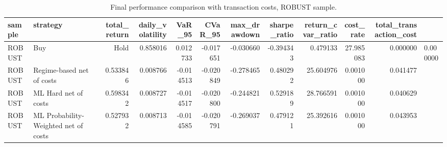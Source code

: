 \begin{table}
\caption{Final performance comparison with transaction costs, ROBUST sample.}
\label{tab:final_performance_metrics_with_costs_robust}
\begin{tabular}{llrrrrrrrrr}
\toprule
sample & strategy & total_return & daily_volatility & VaR_95 & CVaR_95 & max_drawdown & sharpe_ratio & return_cvar_ratio & cost_rate & total_transaction_cost \\
\midrule
ROBUST & Buy & Hold & 0.858016 & 0.012733 & -0.017651 & -0.030660 & -0.394343 & 0.479133 & 27.985083 & 0.000000 & 0.000000 \\
ROBUST & Regime-based net of costs & 0.533846 & 0.008766 & -0.014513 & -0.020849 & -0.278465 & 0.480292 & 25.604976 & 0.001000 & 0.041477 \\
ROBUST & ML Hard net of costs & 0.598342 & 0.008727 & -0.014517 & -0.020800 & -0.244821 & 0.529189 & 28.766591 & 0.001000 & 0.040629 \\
ROBUST & ML Probability-Weighted net of costs & 0.527932 & 0.008713 & -0.014585 & -0.020791 & -0.269037 & 0.479121 & 25.392616 & 0.001000 & 0.043953 \\
\bottomrule
\end{tabular}
\end{table}
